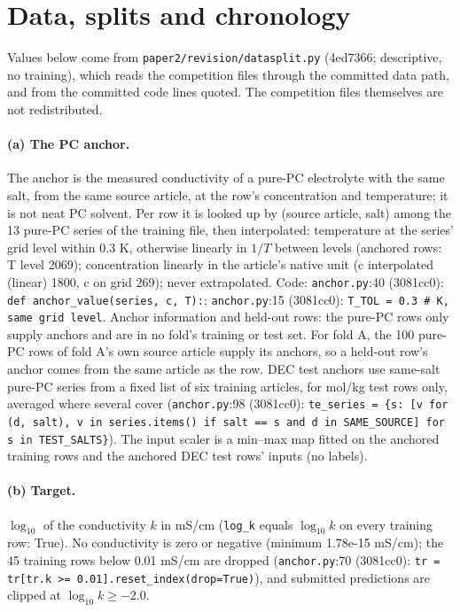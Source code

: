 \section{Data, splits and chronology}\label{app:data}

Values below come from \texttt{paper2/\allowbreak{}revision/\allowbreak{}datasplit.py} (4ed7366; descriptive, no training), which reads the competition files through the committed data path, and from the committed code lines quoted. The competition files themselves are not redistributed.

\paragraph{(a) The PC anchor.} The anchor is the measured conductivity of a pure-PC electrolyte with the same salt, from the same source article, at the row's concentration and temperature; it is not neat PC solvent. Per row it is looked up by (source article, salt) among the 13 pure-PC series of the training file, then interpolated: temperature at the series' grid level within 0.3 K, otherwise linearly in $1/T$ between levels (anchored rows: T level 2069); concentration linearly in the article's native unit (c interpolated (linear) 1800, c on grid 269); never extrapolated. Code: \texttt{anchor.py}:40 (3081cc0): \texttt{def anchor\_\allowbreak{}value(series, c, T):}; \texttt{anchor.py}:15 (3081cc0): \texttt{T\_\allowbreak{}TOL = 0.3  \# K, same grid level}. Anchor information and held-out rows: the pure-PC rows only supply anchors and are in no fold's training or test set. For fold A, the 100 pure-PC rows of fold A's own source article supply its anchors, so a held-out row's anchor comes from the same article as the row. DEC test anchors use same-salt pure-PC series from a fixed list of six training articles, for mol/kg test rows only, averaged where several cover (\texttt{anchor.py}:98 (3081cc0): \texttt{te\_\allowbreak{}series = \{s: [v for (d, salt), v in series.items() if salt == s and d in SAME\_\allowbreak{}SOURCE] for s in TEST\_\allowbreak{}SALTS\}}). The input scaler is a min--max map fitted on the anchored training rows and the anchored DEC test rows' inputs (no labels).

\paragraph{(b) Target.} $\log_{10}$ of the conductivity $k$ in mS/cm (\texttt{log\_k} equals $\log_{10} k$ on every training row: True). No conductivity is zero or negative (minimum 1.78e-15 mS/cm); the 45 training rows below 0.01 mS/cm are dropped (\texttt{anchor.py}:70 (3081cc0): \texttt{tr = tr[tr.k >= 0.01].reset\_\allowbreak{}index(drop=True)}), and submitted predictions are clipped at $\log_{10} k \geq -2.0$.

